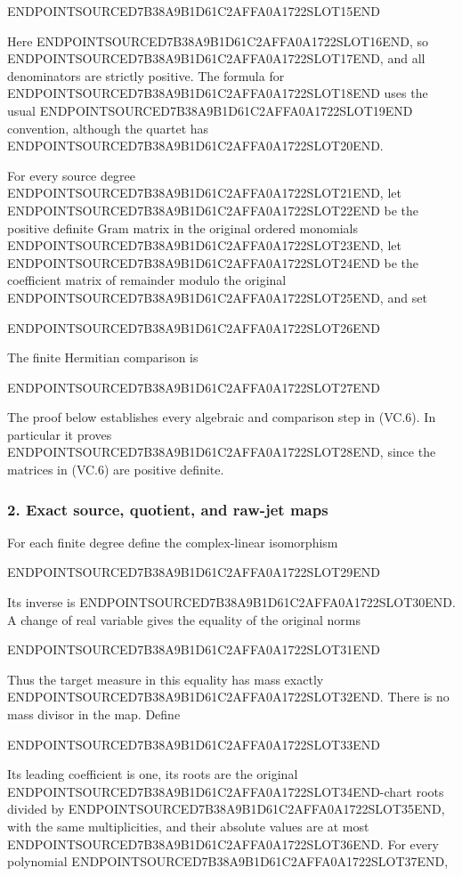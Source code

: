 ENDPOINTSOURCED7B38A9B1D61C2AFFA0A1722SLOT15END

Here ENDPOINTSOURCED7B38A9B1D61C2AFFA0A1722SLOT16END, so ENDPOINTSOURCED7B38A9B1D61C2AFFA0A1722SLOT17END, and all denominators are strictly positive. The formula for ENDPOINTSOURCED7B38A9B1D61C2AFFA0A1722SLOT18END uses the usual ENDPOINTSOURCED7B38A9B1D61C2AFFA0A1722SLOT19END convention, although the quartet has ENDPOINTSOURCED7B38A9B1D61C2AFFA0A1722SLOT20END.

For every source degree ENDPOINTSOURCED7B38A9B1D61C2AFFA0A1722SLOT21END, let ENDPOINTSOURCED7B38A9B1D61C2AFFA0A1722SLOT22END be the positive definite Gram matrix in the original ordered monomials ENDPOINTSOURCED7B38A9B1D61C2AFFA0A1722SLOT23END, let ENDPOINTSOURCED7B38A9B1D61C2AFFA0A1722SLOT24END be the coefficient matrix of remainder modulo the original ENDPOINTSOURCED7B38A9B1D61C2AFFA0A1722SLOT25END, and set

ENDPOINTSOURCED7B38A9B1D61C2AFFA0A1722SLOT26END

The finite Hermitian comparison is

ENDPOINTSOURCED7B38A9B1D61C2AFFA0A1722SLOT27END

The proof below establishes every algebraic and comparison step in (VC.6). In particular it proves ENDPOINTSOURCED7B38A9B1D61C2AFFA0A1722SLOT28END, since the matrices in (VC.6) are positive definite.

\subsubsection{2. Exact source, quotient, and raw-jet maps}\label{endpoint-volume_connection_original--exact-source-quotient-and-raw-jet-maps}

For each finite degree define the complex-linear isomorphism

ENDPOINTSOURCED7B38A9B1D61C2AFFA0A1722SLOT29END

Its inverse is ENDPOINTSOURCED7B38A9B1D61C2AFFA0A1722SLOT30END. A change of real variable gives the equality of the original norms

ENDPOINTSOURCED7B38A9B1D61C2AFFA0A1722SLOT31END

Thus the target measure in this equality has mass exactly ENDPOINTSOURCED7B38A9B1D61C2AFFA0A1722SLOT32END. There is no mass divisor in the map. Define

ENDPOINTSOURCED7B38A9B1D61C2AFFA0A1722SLOT33END

Its leading coefficient is one, its roots are the original ENDPOINTSOURCED7B38A9B1D61C2AFFA0A1722SLOT34END-chart roots divided by ENDPOINTSOURCED7B38A9B1D61C2AFFA0A1722SLOT35END, with the same multiplicities, and their absolute values are at most ENDPOINTSOURCED7B38A9B1D61C2AFFA0A1722SLOT36END. For every polynomial ENDPOINTSOURCED7B38A9B1D61C2AFFA0A1722SLOT37END,

